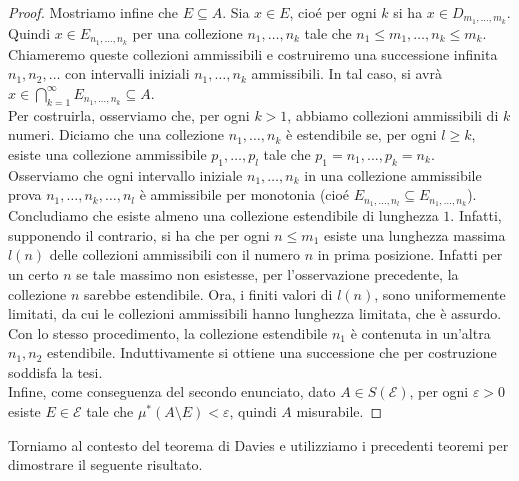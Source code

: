 \documentclass[a4paper, twoside,openright]{article}
\newcommand{\<}{\langle}
\renewcommand{\>}{\rangle}
\begin{document}
\begin{proof}
	Mostriamo infine che $E \subseteq A$. Sia $x \in E$, cioé per ogni $k$ si ha $x \in D_{m_{1}, \ldots, m_{k}}$. Quindi $x \in E_{n_{1}, \ldots, n_{k}}$ per una collezione $n_{1}, \ldots, n_{k}$ tale che $n_{1} \leq m_{1}, \ldots, n_{k} \leq m_{k}$.\\
	Chiameremo queste collezioni ammissibili e costruiremo una successione infinita $n_{1}, n_{2}, \ldots$ con intervalli iniziali $n_{1}, \ldots, n_{k}$ ammissibili.	In tal caso, si avrà $x \in \bigcap_{k=1}^{\infty} E_{n_{1}, \ldots, n_{k}} \subseteq A$.\\
	Per costruirla, osserviamo che, per ogni $k>1$, abbiamo collezioni ammissibili di $k$ numeri. Diciamo che una collezione $n_{1}, \ldots, n_{k}$ è estendibile se, per ogni $l \geq k$, esiste una collezione ammissibile $p_{1}, \ldots, p_{l}$ tale che $p_1=n_1,...,p_k=n_k$.\\
	Osserviamo che ogni intervallo iniziale $n_{1}, \ldots, n_{k}$ in una collezione ammissibile prova $n_{1}, \ldots, n_{k}, \ldots, n_{l}$ è ammissibile per monotonia (cioé $E_{n_{1}, \ldots, n_{l}} \subseteq E_{n_{1}, \ldots, n_{k}}$).\\
	Concludiamo che esiste almeno una collezione estendibile di lunghezza $1$. Infatti, supponendo il contrario, si ha che per ogni $n \leq m_{1}$ esiste una lunghezza massima $l(n)$ delle collezioni ammissibili con il numero $n$ in prima posizione. Infatti per un certo $n$ se tale massimo non esistesse, per l'osservazione precedente, la collezione $n$ sarebbe estendibile. Ora, i finiti valori di $l(n)$, sono uniformemente limitati, da cui le collezioni ammissibili hanno lunghezza limitata, che è assurdo.\\
	Con lo stesso procedimento, la collezione estendibile $n_{1}$ è contenuta in un'altra $n_{1}, n_{2}$ estendibile. Induttivamente si ottiene una successione che per costruzione soddisfa la tesi.\\
	Infine, come conseguenza del secondo enunciato, dato $A \in S(\mathcal{E})$, per ogni $\varepsilon >0$ esiste $E \in \mathcal{E}$ tale che $\mu^*(A \setminus E) < \varepsilon$, quindi $A$ misurabile.

\end{proof}

Torniamo al contesto del teorema di Davies e utilizziamo i precedenti teoremi per dimostrare il seguente risultato.
\end{document}
